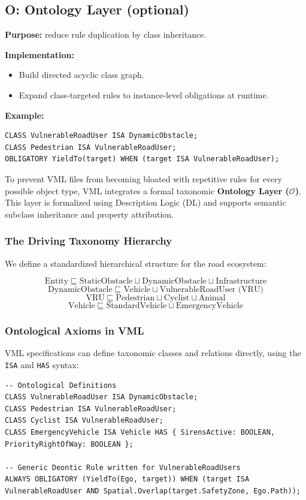 \documentclass[11pt,a4paper]{article}
\begin{document}
\subsection{O: Ontology Layer (optional)}
\textbf{Purpose:} reduce rule duplication by class inheritance.

\textbf{Implementation:}
\begin{itemize}[leftmargin=*]
  \item Build directed acyclic class graph.
  \item Expand class-targeted rules to instance-level obligations at runtime.
\end{itemize}

\textbf{Example:}
\begin{lstlisting}
CLASS VulnerableRoadUser ISA DynamicObstacle;
CLASS Pedestrian ISA VulnerableRoadUser;
OBLIGATORY YieldTo(target) WHEN (target ISA VulnerableRoadUser);
\end{lstlisting}

To prevent VML files from becoming bloated with repetitive rules for every possible object type, VML integrates a formal taxonomic \textbf{Ontology Layer ($\mathcal{O}$)}. This layer is formalized using Description Logic (DL) and supports semantic subclass inheritance and property attribution.

\subsubsection{The Driving Taxonomy Hierarchy}
We define a standardized hierarchical structure for the road ecosystem:

\[
\text{Entity} \sqsubseteq \text{StaticObstacle} \sqcup \text{DynamicObstacle} \sqcup \text{Infrastructure}
\]
\[
\text{DynamicObstacle} \sqsubseteq \text{Vehicle} \sqcup \text{VulnerableRoadUser (VRU)}
\]
\[
\text{VRU} \sqsubseteq \text{Pedestrian} \sqcup \text{Cyclist} \sqcup \text{Animal}
\]
\[
\text{Vehicle} \sqsubseteq \text{StandardVehicle} \sqcup \text{EmergencyVehicle}
\]

\subsubsection{Ontological Axioms in VML}
VML specifications can define taxonomic classes and relations directly, using the \texttt{ISA} and \texttt{HAS} syntax:

\begin{lstlisting}
-- Ontological Definitions
CLASS VulnerableRoadUser ISA DynamicObstacle;
CLASS Pedestrian ISA VulnerableRoadUser;
CLASS Cyclist ISA VulnerableRoadUser;
CLASS EmergencyVehicle ISA Vehicle HAS { SirensActive: BOOLEAN, PriorityRightOfWay: BOOLEAN };

-- Generic Deontic Rule written for VulnerableRoadUsers
ALWAYS OBLIGATORY (YieldTo(Ego, target)) WHEN (target ISA VulnerableRoadUser AND Spatial.Overlap(target.SafetyZone, Ego.Path));
\end{lstlisting}
\end{document}
